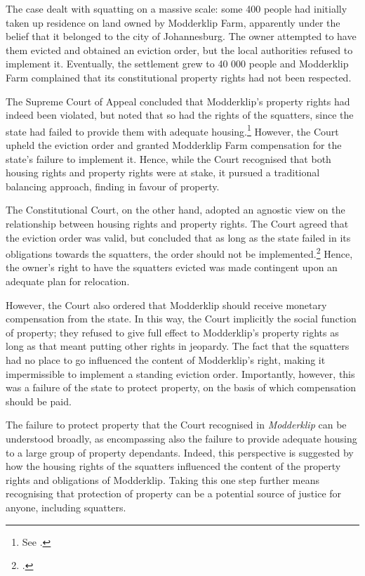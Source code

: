 The case dealt with squatting on a massive scale: some 400 people had initially taken up residence on land owned by Modderklip Farm, apparently under the belief that it belonged to the city of Johannesburg. The owner attempted to have them evicted and obtained an eviction order, but the local authorities refused to implement it. Eventually, the settlement grew to 40 000 people and Modderklip Farm complained that its constitutional property rights had not been respected.

The Supreme Court of Appeal concluded that Modderklip's property rights had indeed been violated, but noted that so had the rights of the squatters, since the state had failed to provide them with adequate housing.\footnote{See \cite{modderklip04}.} However, the Court upheld the eviction order and granted Modderklip Farm compensation for the state's failure to implement it. Hence, while the Court recognised that both housing rights and property rights were at stake, it pursued a traditional balancing approach, finding in favour of property.

The Constitutional Court, on the other hand, adopted an agnostic view on the relationship between housing rights and property rights. The Court agreed that the eviction order was valid, but concluded that as long as the state failed in its obligations towards the squatters, the order should not be implemented.\footcite{modderklip05} Hence, the owner's right to have the squatters evicted was made contingent upon an adequate plan for relocation. 

However, the Court also ordered that Modderklip should receive monetary compensation from the state. In this way, the Court implicitly  the social function of property; they refused to give full effect to Modderklip's property rights as long as that meant putting other rights in jeopardy. The fact that the squatters had no place to go influenced the content of Modderklip's right, making it impermissible to implement a standing eviction order. Importantly, however, this was a failure of the state to protect property, on the basis of which compensation should be paid.

The failure to protect property that the Court recognised in {\it Modderklip} can be understood broadly, as encompassing also the failure to provide adequate housing to a large group of property dependants. Indeed, this perspective is suggested by how the housing rights of the squatters influenced the content of the property rights and obligations of Modderklip. Taking this one step further means recognising that protection of property can be a potential source of justice for anyone, including squatters.

